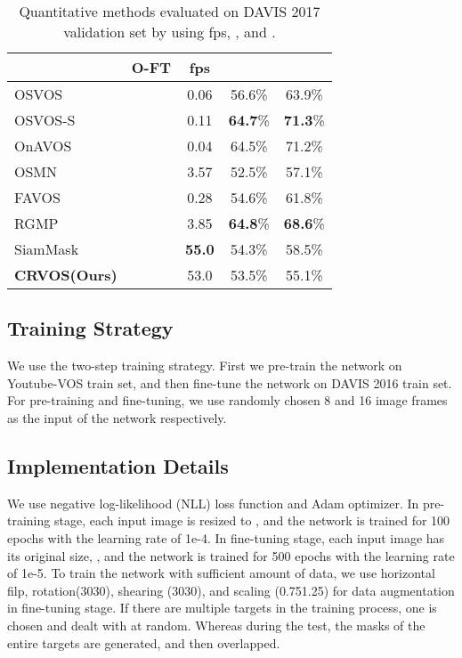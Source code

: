 \documentclass{article}
\begin{document}
\begin{table}[t]
	\centering
	\begin{tabular}{l | c c c c}
		                                     & O-FT       & fps           &  &  \\ \midrule
		OSVOS \cite{caelles2017one}          & \checkmark & 0.06          & 56.6\%                & 63.9\%                \\
		OSVOS-S \cite{maninis2018video}      & \checkmark & 0.11          & \textbf{64.7}\%       & \textbf{71.3}\%       \\
		OnAVOS \cite{voigtlaender2017online} & \checkmark & 0.04          & 64.5\%                & 71.2\%                \\ \midrule
		OSMN \cite{yang2018efficient}        &            & 3.57          & 52.5\%                & 57.1\%                \\
		FAVOS \cite{cheng2018fast}           &            & 0.28          & 54.6\%                & 61.8\%                \\
		RGMP \cite{wug2018fast}              &            & 3.85          & \textbf{64.8}\%       & \textbf{68.6}\%       \\
		SiamMask \cite{wang2019fast}         &            & \textbf{55.0} & 54.3\%                & 58.5\%                \\
		\textbf{CRVOS(Ours)}                 &            & 53.0          & 53.5\%                & 55.1\%
	\end{tabular}
	\caption{Quantitative methods evaluated on DAVIS 2017 validation set by using fps, , and .}
	\label{results table 17}
\end{table}



\subsection{Training Strategy} \label{training}
We use the two-step training strategy. First we pre-train the network on Youtube-VOS \cite{xu2018youtube_1} train set, and then fine-tune the network on DAVIS 2016 \cite{perazzi2016benchmark} train set. For pre-training and fine-tuning, we use randomly chosen 8 and 16 image frames as the input of the network respectively.



\subsection{Implementation Details}
We use negative log-likelihood (NLL) loss function and Adam optimizer. In pre-training stage, each input image is resized to , and the network is trained for 100 epochs with the learning rate of 1e-4. In fine-tuning stage, each input image has its original size, , and the network is trained for 500 epochs with the learning rate of 1e-5. To train the network with sufficient amount of data, we use horizontal filp, rotation(3030), shearing (3030), and scaling (0.751.25) for data augmentation in fine-tuning stage. If there are multiple targets in the training process, one is chosen and dealt with at random. Whereas during the test, the masks of the entire targets are generated, and then overlapped.
\end{document}
